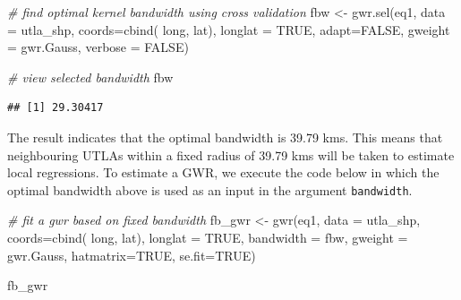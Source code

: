 \documentclass[
]{book}
\newenvironment{Shaded}{\begin{snugshade}}{\end{snugshade}}
\newcommand{\AttributeTok}[1]{\textcolor[rgb]{0.77,0.63,0.00}{#1}}
\newcommand{\CommentTok}[1]{\textcolor[rgb]{0.56,0.35,0.01}{\textit{#1}}}
\newcommand{\ConstantTok}[1]{\textcolor[rgb]{0.00,0.00,0.00}{#1}}
\newcommand{\FunctionTok}[1]{\textcolor[rgb]{0.00,0.00,0.00}{#1}}
\newcommand{\NormalTok}[1]{#1}
\newcommand{\OtherTok}[1]{\textcolor[rgb]{0.56,0.35,0.01}{#1}}
\begin{document}
\begin{Shaded}
\begin{Highlighting}[]
\CommentTok{\# find optimal kernel bandwidth using cross validation}
\NormalTok{fbw }\OtherTok{\textless{}{-}} \FunctionTok{gwr.sel}\NormalTok{(eq1, }
               \AttributeTok{data =}\NormalTok{ utla\_shp, }
               \AttributeTok{coords=}\FunctionTok{cbind}\NormalTok{( long, lat),}
               \AttributeTok{longlat =} \ConstantTok{TRUE}\NormalTok{,}
               \AttributeTok{adapt=}\ConstantTok{FALSE}\NormalTok{, }
               \AttributeTok{gweight =}\NormalTok{ gwr.Gauss, }
               \AttributeTok{verbose =} \ConstantTok{FALSE}\NormalTok{)}

\CommentTok{\# view selected bandwidth}
\NormalTok{fbw}
\end{Highlighting}
\end{Shaded}

\begin{verbatim}
## [1] 29.30417
\end{verbatim}

The result indicates that the optimal bandwidth is 39.79 kms. This means that neighbouring UTLAs within a fixed radius of 39.79 kms will be taken to estimate local regressions. To estimate a GWR, we execute the code below in which the optimal bandwidth above is used as an input in the argument \texttt{bandwidth}.

\begin{Shaded}
\begin{Highlighting}[]
\CommentTok{\# fit a gwr based on fixed bandwidth}
\NormalTok{fb\_gwr }\OtherTok{\textless{}{-}} \FunctionTok{gwr}\NormalTok{(eq1, }
            \AttributeTok{data =}\NormalTok{ utla\_shp,}
            \AttributeTok{coords=}\FunctionTok{cbind}\NormalTok{( long, lat),}
            \AttributeTok{longlat =} \ConstantTok{TRUE}\NormalTok{,}
            \AttributeTok{bandwidth =}\NormalTok{ fbw, }
            \AttributeTok{gweight =}\NormalTok{ gwr.Gauss,}
            \AttributeTok{hatmatrix=}\ConstantTok{TRUE}\NormalTok{, }
            \AttributeTok{se.fit=}\ConstantTok{TRUE}\NormalTok{)}

\NormalTok{fb\_gwr}
\end{Highlighting}
\end{Shaded}
\end{document}
